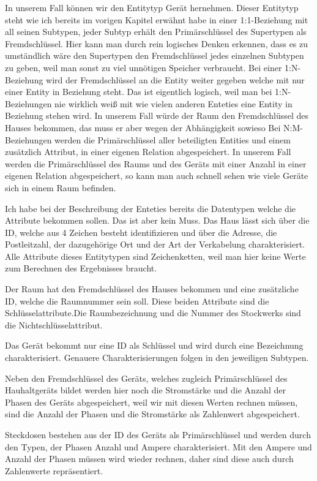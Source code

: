 \begin{flushleft}
In unserem Fall können wir den Entitytyp Gerät hernehmen. Dieser Entitytyp steht wie ich bereits im vorigen Kapitel erwähnt habe in einer 1:1-Beziehung mit all seinen Subtypen, jeder Subtyp erhält den Primärschlüssel des Supertypen als Fremdschlüssel. Hier kann man durch rein logisches Denken erkennen, dass es zu umständlich wäre den Supertypen den Fremdschlüssel jedes einzelnen Subtypen zu geben, weil man sonst zu viel unnötigen Speicher verbraucht.
Bei einer 1:N-Beziehung wird der Fremdschlüssel an die Entity weiter gegeben welche mit nur einer Entity in Beziehung steht. Das ist eigentlich logisch, weil man bei 1:N-Beziehungen nie wirklich weiß mit wie vielen anderen Enteties eine Entity in Beziehung stehen wird. In unserem Fall würde der Raum den Fremdschlüssel des Hauses bekommen, das muss er aber wegen der Abhängigkeit sowieso
Bei N:M-Beziehungen werden die Primärschlüssel aller beteiligten Entities und einem zusätzlich Attribut, in einer eigenen Relation abgespeichert.
In unserem Fall werden die Primärschlüssel des Raums und des Geräts mit einer Anzahl in einer eigenen Relation abgespeichert, so kann man auch schnell sehen wie viele Geräte sich in einem Raum befinden. 

Ich habe bei der Beschreibung der Enteties bereits die Datentypen welche die Attribute bekommen sollen. Das ist aber kein Muss. 
Das Haus lässt sich über die ID, welche aus 4 Zeichen besteht identifizieren und über die Adresse, die Postleitzahl, der dazugehörige Ort und der Art der Verkabelung charakterisiert. Alle Attribute dieses Entitytypen sind Zeichenketten, weil man hier keine Werte zum Berechnen des Ergebnisses braucht.

Der Raum hat den Fremdschlüssel des Hauses bekommen und eine zusätzliche ID, welche die Raumnummer sein soll. Diese beiden Attribute sind die Schlüsselattribute.Die Raumbezeichnung und die Nummer des Stockwerks sind die Nichtschlüsselattribut.

Das Gerät bekommt nur eine ID als Schlüssel und wird durch eine Bezeichnung charakterisiert. Genauere Charakterisierungen folgen in den jeweiligen Subtypen.

Neben den Fremdschlüssel des Geräts, welches zugleich Primärschlüssel des Hauhaltgeräts bildet werden hier noch die Stromstärke und die Anzahl der Phasen des Geräts abgespeichert, weil wir mit diesen Werten rechnen müssen, sind die Anzahl der Phasen und die Stromstärke als Zahlenwert abgespeichert. 

Steckdosen bestehen aus der ID des Geräts als Primärschlüssel und werden durch den Typen, der Phasen Anzahl und Ampere charakterisiert. Mit den Ampere und Anzahl der Phasen müssen wird wieder rechnen, daher sind diese auch durch Zahlenwerte repräsentiert.


\end{flushleft}
